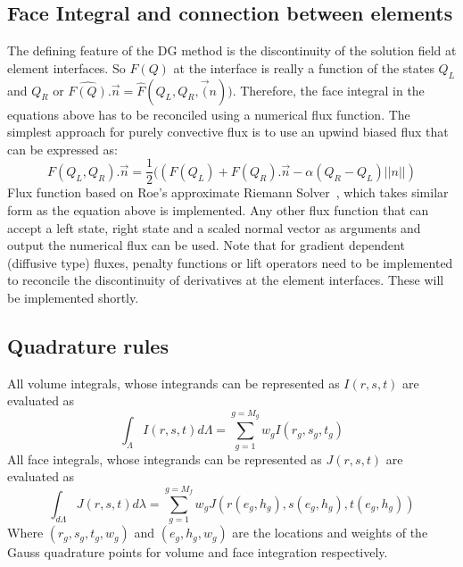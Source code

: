 \documentclass[11pt]{article}
\begin{document}
\subsection{Face Integral and connection between elements}
The defining feature of the DG method is the discontinuity of the solution field at element interfaces. So $F(Q)$ at the interface
is really a function of the states $Q_L$ and $Q_R$ or $\hat{F(Q)}.\vec{n} = \hat{F}(Q_L,Q_R,\vec(n))$. Therefore, the face
integral in the equations above has to be reconciled using a numerical flux function. The simplest approach for purely
convective flux is to use an upwind biased flux that can be expressed as:
\begin{equation}
  F(Q_L,Q_R).\vec{n} = \frac{1}{2}((F(Q_L)+F(Q_R).{\vec{n}} - \alpha (Q_R - Q_L) \vert\vert n \vert \vert)
\end{equation} 
Flux function based on Roe's approximate Riemann Solver~\cite{Roe}, which takes similar form as the equation above
is implemented. Any other flux function that can accept a left state, right state and a scaled normal vector as
arguments and output the numerical flux can be used. Note that for gradient dependent (diffusive type) fluxes, penalty
functions or lift operators need to be implemented to reconcile the discontinuity of derivatives at the element interfaces.
These will be implemented shortly.
\subsection{Quadrature rules}
All volume integrals, whose integrands can be represented as $I(r,s,t)$ are evaluated as
\begin{equation}
  \int_\Lambda I(r,s,t) d\Lambda = \sum_{g=1}^{g=M_g} w_g I(r_g,s_g,t_g)
\end{equation}
All face integrals, whose integrands can be represented as $J(r,s,t)$ are evaluated as
\begin{equation}
  \int_{d\Lambda} J(r,s,t) d \lambda = \sum_{g=1}^{g=M_f} w_g J(r(e_g,h_g),s(e_g,h_g),t(e_g,h_g))
\end{equation}
Where $(r_g,s_g,t_g,w_g)$ and $(e_g,h_g,w_g)$ are the locations and weights of the Gauss quadrature points for volume
and face integration respectively.
\end{document}
